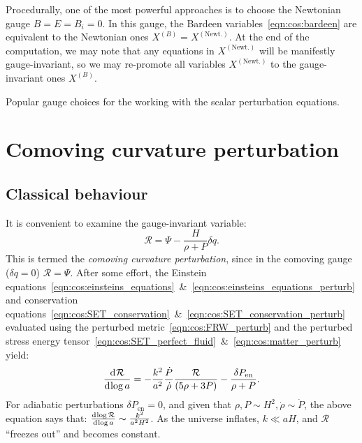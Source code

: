 Procedurally, one of  the most powerful approaches is to choose the Newtonian gauge \({B=E=B_i=0}\). In this gauge, the Bardeen variables~\eqref{eqn:cos:bardeen} are equivalent to the Newtonian ones \(X^{(B)}=X^{(\text{Newt.})}\). At the end of the computation, we may note that any equations in \(X^{(\text{Newt.})}\) will be manifestly gauge-invariant, so we may re-promote all variables \(X^{(\text{Newt.})}\) to the gauge-invariant ones \(X^{(B)}\).


\begin{table}[tp]
  \centering
  
\caption{Popular gauge choices for the working with the scalar perturbation equations.}\label{tab:cos:gauge_choice}
\end{table}

\section{Comoving curvature perturbation}
\label{cos:sec:comoving_curvature_perturbation}

\subsection{Classical behaviour}
It is convenient to examine the gauge-invariant variable:
\begin{equation}
  \mathcal{R} = \Psi - \frac{H}{\rho+P}\delta q.
  \label{eqn:cos:CCP}
\end{equation}
This is termed the {\em comoving curvature perturbation}, since in the comoving gauge (\(\delta q=0\)) \(\mathcal{R}=\Psi\).
After some effort, the Einstein equations~\eqref{eqn:cos:einsteins_equations}~\&~\eqref{eqn:cos:einsteins_equations_perturb} and conservation equations~\eqref{eqn:cos:SET_conservation}~\&~\eqref{eqn:cos:SET_conservation_perturb} evaluated using the perturbed metric~\eqref{eqn:cos:FRW_perturb} and the perturbed stress energy tensor~\eqref{eqn:cos:SET_perfect_fluid}~\&~\eqref{eqn:cos:matter_perturb} yield:
\begin{equation}
  \frac{\operatorname{d}^{}\!{\mathcal{R}}}{\operatorname{d}^{}\!{\log a}} = 
  -\frac{k^2}{a^2}\frac{\dot{P}}{\dot{\rho}}\frac{\mathcal{R}}{(5\rho + 3P)}
  -\frac{\delta P_\mathrm{en}}{\rho+P}.
\end{equation}
For adiabatic perturbations \(\delta P_\mathrm{en}=0\), and given that \(\rho,P\sim H^2, \dot{\rho}\sim\dot{P}\), the above equation says that: \(\frac{\operatorname{d}^{}\!{\log \mathcal{R}}}{\operatorname{d}^{}\!{\log a}} \sim \frac{k^2}{a^2H^2}\). As the universe inflates, \(k\ll aH\), and \(\mathcal{R}\) ``freezes out'' and becomes constant.

